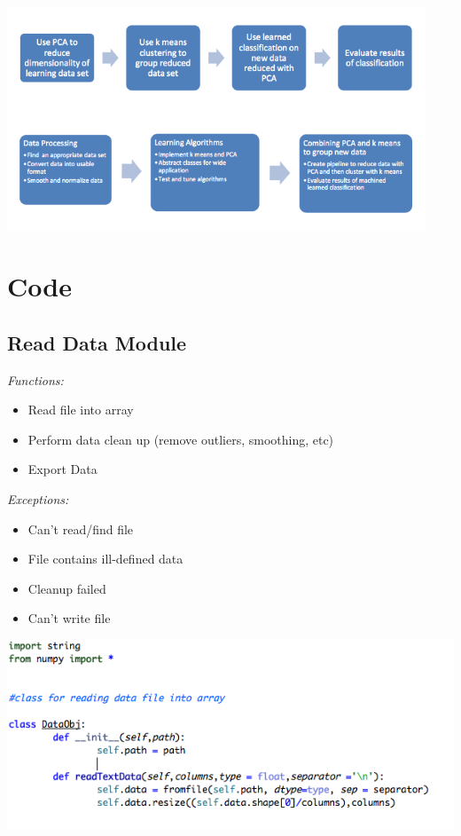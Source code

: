\documentclass[12pt]{article} %
\begin{document}
\begin{center}
\includegraphics[width=125mm]{flowchart.png}
\end{center}


\section{Code}

\subsection{Read Data Module}
\emph{Functions:}
\begin{itemize}
	\item Read file into array 
	\item Perform data clean up (remove outliers, smoothing, etc)
	\item Export Data 
\end{itemize}

\emph{Exceptions:}
\begin{itemize}
	\item Can't read/find file
	\item File contains ill-defined data 
	\item Cleanup failed
	\item Can't write file 
\end{itemize}
 
\begin{center}
\includegraphics[width=\textwidth]{claudia4.png}
\end{center}
\end{document}
